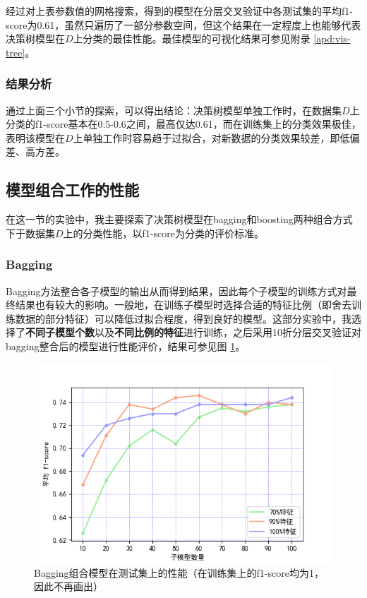 \documentclass[12pt,a4paper]{article}
\theoremstyle{definition}
\begin{document}
经过对上表参数值的网格搜索，得到的模型在分层交叉验证中各测试集的平均f1-score为0.61，虽然只遍历了一部分参数空间，但这个结果在一定程度上也能够代表决策树模型在$D$上分类的最佳性能。最佳模型的可视化结果可参见附录 \ref{apd:vis-tree}。

\subsubsection{结果分析}

通过上面三个小节的探索，可以得出结论：决策树模型单独工作时，在数据集$D$上分类的f1-score基本在0.5-0.6之间，最高仅达0.61，而在训练集上的分类效果极佳，表明该模型在$D$上单独工作时容易趋于过拟合，对新数据的分类效果较差，即低偏差、高方差。

\subsection{模型组合工作的性能}
\label{sec:bagging}

在这一节的实验中，我主要探索了决策树模型在bagging和boosting两种组合方式下于数据集$D$上的分类性能，以f1-score为分类的评价标准。

\subsubsection{Bagging}

Bagging方法整合各子模型的输出从而得到结果，因此每个子模型的训练方式对最终结果也有较大的影响。一般地，在训练子模型时选择合适的特征比例（即舍去训练数据的部分特征）可以降低过拟合程度，得到良好的模型。这部分实验中，我选择了\textbf{不同子模型个数}以及\textbf{不同比例的特征}进行训练，之后采用10折分层交叉验证对bagging整合后的模型进行性能评价，结果可参见图 \ref{fig:bagging}。

\vspace{-0.015\linewidth}
\begin{figure}[H]
	\centering
	\includegraphics[width=0.8\linewidth]{img/bagging_kline.png}
	\caption{Bagging组合模型在测试集上的性能（在训练集上的f1-score均为1，因此不再画出）}
	\label{fig:bagging}
\end{figure}
\end{document}
